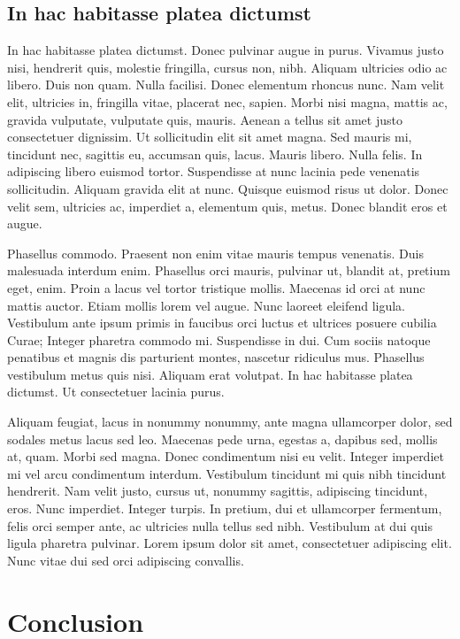 \documentclass{cascadilla}
\begin{document}
\subsection{In hac habitasse platea dictumst}
In hac habitasse platea dictumst. Donec pulvinar augue in purus. Vivamus justo
nisi, hendrerit quis, molestie fringilla, cursus non, nibh. Aliquam ultricies
odio ac libero. Duis non quam. Nulla facilisi. Donec elementum rhoncus nunc.
Nam velit elit, ultricies in, fringilla vitae, placerat nec, sapien. Morbi
nisi magna, mattis ac, gravida vulputate, vulputate quis, mauris. Aenean a
tellus sit amet justo consectetuer dignissim. Ut sollicitudin elit sit amet
magna. Sed mauris mi, tincidunt nec, sagittis eu, accumsan quis, lacus. Mauris
libero. Nulla felis. In adipiscing libero euismod tortor. Suspendisse at nunc
lacinia pede venenatis sollicitudin. Aliquam gravida elit at nunc. Quisque
euismod risus ut dolor. Donec velit sem, ultricies ac, imperdiet a, elementum
quis, metus. Donec blandit eros et augue.

Phasellus commodo. Praesent non enim vitae mauris tempus venenatis. Duis
malesuada interdum enim. Phasellus orci mauris, pulvinar ut, blandit at,
pretium eget, enim. Proin a lacus vel tortor tristique mollis. Maecenas id
orci at nunc mattis auctor. Etiam mollis lorem vel augue. Nunc laoreet
eleifend ligula. Vestibulum ante ipsum primis in faucibus orci luctus et
ultrices posuere cubilia Curae; Integer pharetra commodo mi. Suspendisse in
dui. Cum sociis natoque penatibus et magnis dis parturient montes, nascetur
ridiculus mus. Phasellus vestibulum metus quis nisi. Aliquam erat volutpat. In
hac habitasse platea dictumst. Ut consectetuer lacinia purus.

Aliquam feugiat, lacus in nonummy nonummy, ante magna ullamcorper dolor, sed
sodales metus lacus sed leo. Maecenas pede urna, egestas a, dapibus sed,
mollis at, quam. Morbi sed magna. Donec condimentum nisi eu velit. Integer
imperdiet mi vel arcu condimentum interdum. Vestibulum tincidunt mi quis nibh
tincidunt hendrerit. Nam velit justo, cursus ut, nonummy sagittis, adipiscing
tincidunt, eros. Nunc imperdiet. Integer turpis. In pretium, dui et
ullamcorper fermentum, felis orci semper ante, ac ultricies nulla tellus sed
nibh. Vestibulum at dui quis ligula pharetra pulvinar. Lorem ipsum dolor sit
amet, consectetuer adipiscing elit. Nunc vitae dui sed orci adipiscing
convallis. 

\section{Conclusion}
\end{document}

